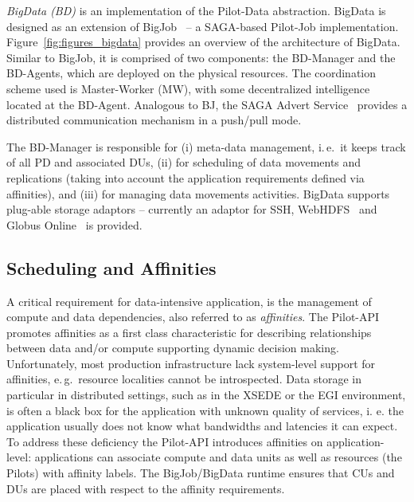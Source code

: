 \documentclass{acm_proc_article-sp}
\newcommand{\jhanote}[1]{ {\textcolor{red} { ***SJ: #1 }}}
\newcommand{\alnote}[1]{ {\textcolor{blue} { ***andreL: #1 }}}
\newcommand{\alnote}[1]{}
\newcommand{\jhanote}[1]{}
\newcommand{\upp}{\vspace*{-0.5em}}
\newcommand{\pilots}{Pilots\xspace}
\newcommand{\dus}{DUs\xspace}
\newcommand{\pd}{PD\xspace}
\begin{document}
{\it BigData (BD)} is an implementation of the Pilot-Data
abstraction. BigData is designed as an extension of 
BigJob~\cite{bigjob_web} -- a SAGA-based Pilot-Job implementation.
Figure~\ref{fig:figures_bigdata} provides an overview of the
architecture of BigData. Similar to BigJob, it is comprised of two
components: the BD-Manager and the BD-Agents, which are deployed on
the physical resources.  The coordination scheme used is Master-Worker
(MW), with some decentralized intelligence located at the BD-Agent.
Analogous to BJ, the SAGA Advert Service~\cite{saga_advert} 
provides a distributed communication mechanism in a push/pull mode.

The BD-Manager is responsible for (i) meta-data management, i.\,e.\ it
keeps track of all \pd and associated \dus, 
(ii) for scheduling of data movements and replications 
(taking into account the application requirements defined
via affinities), and (iii) for managing data movements activities. 
BigData supports plug-able storage adaptors -- currently an adaptor 
for SSH, WebHDFS~\cite{webhdfs} and Globus Online~\cite{10.1109/MIC.2011.64}
is provided. 


\upp
\subsection{Scheduling and Affinities}
\label{sec-affinities}

A critical requirement for data-intensive application, is the management
of compute and data dependencies, also referred to as {\it affinities}. 
The Pilot-API promotes affinities as a first class
characteristic for describing relationships between data and/or
compute supporting dynamic decision making. Unfortunately, most
production infrastructure lack system-level support for affinities,
e.\,g.\ resource localities cannot be introspected. Data storage in
particular in distributed settings, such as in the XSEDE or the EGI
environment, is often a black box for the application with unknown
quality of services, i. e. the application usually does not know what
bandwidths and latencies it can expect. To address these deficiency
the Pilot-API introduces affinities on application-level: applications
can associate compute and data units as well as resources (the
\pilots) with affinity labels. The BigJob/BigData runtime ensures that CUs and 
DUs are placed with respect to the affinity requirements. 
\end{document}
